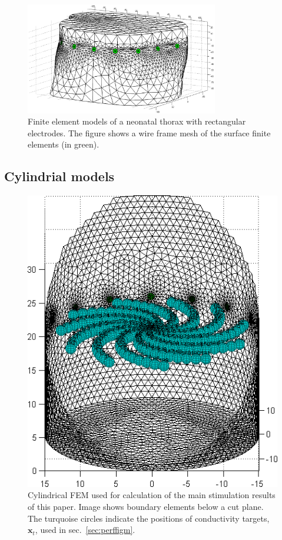 \documentclass[12pt]{iopart}
\newcommand{\xB}{\mbox{$\mathbf{x}$}}
\begin{document}
\begin{figure}[bhtp]
\begin{center}
   \includegraphics[width= 0.75\textwidth]
         {figures/neonate_t_mdl.png}
\caption{ \label{fig:NeonateFEM}
Finite element models of a neonatal thorax with
rectangular electrodes. The figure shows a wire frame mesh
of the surface finite elements (in green).
}
\end{center}
\end{figure}


\subsection{Cylindrial models}

\begin{figure}[bhtp]
\begin{center}
  \includegraphics[width= 0.4 \textwidth, bb=0 0 444 517]
         {../../tutorial/GREIT-evaluation/simulation_3d_test02a.png}
\caption{ \label{fig:CylMesh}
Cylindrical FEM used for calculation of the main stimulation
results of this paper. Image shows boundary elements below a cut plane.
The turquoise circles indicate the
positions of conductivity targets, $\xB_t$, used in
sec.\ \ref{sec:perffigm}.
}
\end{center}
\end{figure}
\end{document}
